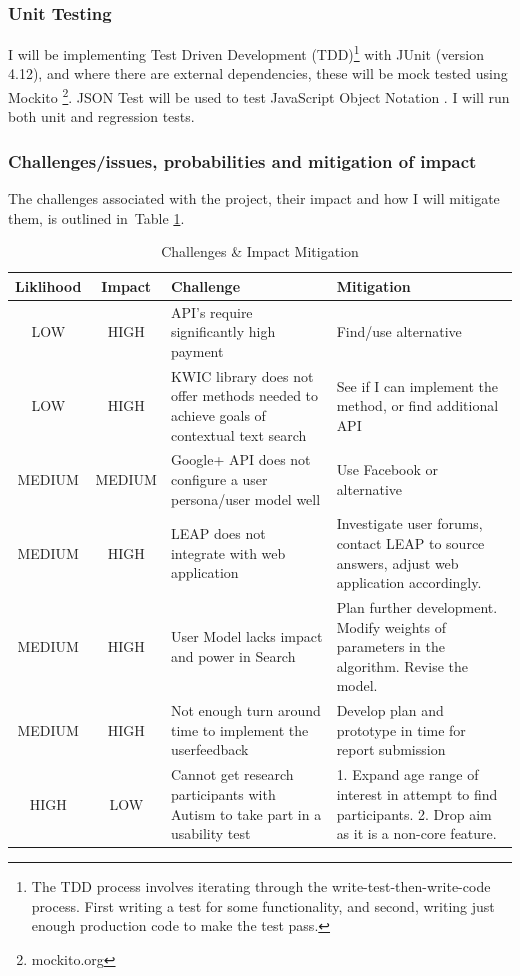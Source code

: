 \documentclass[a4paper, 10pt]{article}
\begin{document}
\subsubsection{Unit Testing}
I will be implementing Test Driven Development (TDD)\footnote{The TDD process involves iterating through the write-test-then-write-code process. First writing a test for some functionality, and second, writing just enough production code to make the test pass.} with JUnit (version 4.12), and where there are external dependencies, these will be mock tested using Mockito \footnote{mockito.org}. JSON Test will be used to test JavaScript Object Notation \cite{jsontest}. I will run both unit and regression tests.

\subsubsection{Challenges/issues, probabilities and mitigation of impact}
The challenges associated with the project, their impact and how I will mitigate them, is outlined in~Table \ref{risks}. 
\begin{table}[H]
\caption{Challenges \& Impact Mitigation} 
\centering
\begin{tabular}{|c | c | p{5cm} | p{5cm} |}
\hline\hline 
Liklihood & Impact & Challenge & Mitigation\\ [0.5ex]
\hline 
LOW & HIGH & API's require significantly high payment & Find/use alternative\\
\hline 
LOW & HIGH & KWIC library does not offer methods needed to achieve goals of contextual text search & See if I can implement the method, or find additional API\\
\hline 
MEDIUM & MEDIUM & Google+ API does not configure a user persona/user model well & Use Facebook or alternative\\
\hline 
MEDIUM & HIGH & LEAP does not integrate with web application & Investigate user forums, contact LEAP to source answers, adjust web application accordingly.\\
\hline
MEDIUM & HIGH & User Model lacks impact and power in Search & Plan further development. Modify weights of parameters in the algorithm. Revise the model. \\
\hline 
MEDIUM & HIGH & Not enough turn around time to implement the userfeedback & Develop plan and prototype in time for report submission\\
\hline
HIGH & LOW & Cannot get research participants with Autism to take part in a usability test & 1. Expand age range of interest in attempt to find participants. 2. Drop aim as it is a non-core feature.\\ 
\hline[1ex]

\end{tabular}
\label{risks} 
\end{table}
\end{document}
